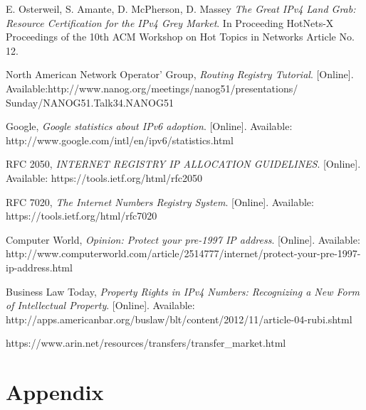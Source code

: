 \documentclass[11pt,a4paper]{scrreprt}
\begin{document}
\begin{thebibliography}{count}
	E. Osterweil, S. Amante, D. McPherson, D. Massey
	\emph{The Great IPv4 Land Grab: Resource Certification for the
IPv4 Grey Market}.
	In Proceeding HotNets-X Proceedings of the 10th ACM Workshop on Hot Topics in Networks Article No. 12.
 
	North American Network Operator' Group,
	\emph{Routing Registry Tutorial}.
	[Online]. Available:http://www.nanog.org/meetings/nanog51/presentations/
	Sunday/NANOG51.Talk34.NANOG51%
	
	Google,
	\emph{Google statistics about IPv6 adoption}.
	[Online]. Available: http://www.google.com/intl/en/ipv6/statistics.html	
	
	RFC 2050,
	\emph{INTERNET REGISTRY IP ALLOCATION GUIDELINES}.
	[Online]. Available: https://tools.ietf.org/html/rfc2050	
	
	RFC 7020,
	\emph{The Internet Numbers Registry System}.
	[Online]. Available: https://tools.ietf.org/html/rfc7020
	
	Computer World,
	\emph{Opinion: Protect your pre-1997 IP address}.
	[Online]. Available: http://www.computerworld.com/article/2514777/internet/protect-your-pre-1997-ip-address.html
	
	Business Law Today,
	\emph{Property Rights in IPv4 Numbers: Recognizing a New Form of Intellectual Property}.
	[Online]. Available: http://apps.americanbar.org/buslaw/blt/content/2012/11/article-04-rubi.shtml
	

	
	https://www.arin.net/resources/transfers/transfer\_market.html
	
\end{thebibliography}	

\chapter{Appendix}
\end{document}
